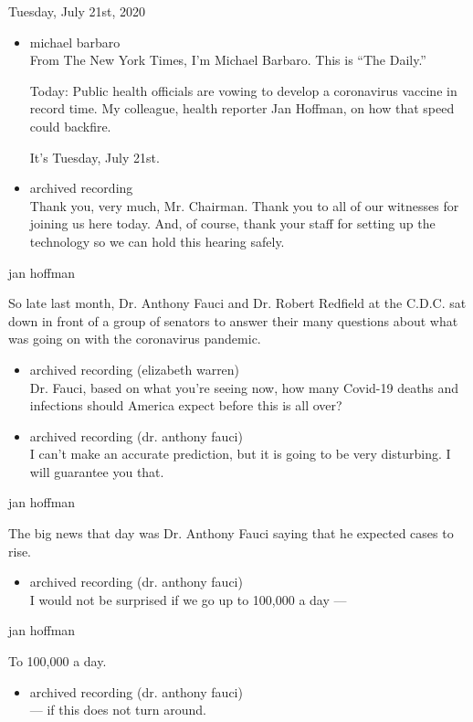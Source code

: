 Tuesday, July 21st, 2020

\begin{itemize}
\item
  michael barbaro\\
  From The New York Times, I'm Michael Barbaro. This is ``The Daily.''

  Today: Public health officials are vowing to develop a coronavirus
  vaccine in record time. My colleague, health reporter Jan Hoffman, on
  how that speed could backfire.

  It's Tuesday, July 21st.
\item
  archived recording\\
  Thank you, very much, Mr. Chairman. Thank you to all of our witnesses
  for joining us here today. And, of course, thank your staff for
  setting up the technology so we can hold this hearing safely.
\end{itemize}

jan hoffman

So late last month, Dr. Anthony Fauci and Dr. Robert Redfield at the
C.D.C. sat down in front of a group of senators to answer their many
questions about what was going on with the coronavirus pandemic.

\begin{itemize}
\item
  archived recording (elizabeth warren)\\
  Dr. Fauci, based on what you're seeing now, how many Covid-19 deaths
  and infections should America expect before this is all over?
\item
  archived recording (dr. anthony fauci)\\
  I can't make an accurate prediction, but it is going to be very
  disturbing. I will guarantee you that.
\end{itemize}

jan hoffman

The big news that day was Dr. Anthony Fauci saying that he expected
cases to rise.

\begin{itemize}
\tightlist
\item
  archived recording (dr. anthony fauci)\\
  I would not be surprised if we go up to 100,000 a day ---
\end{itemize}

jan hoffman

To 100,000 a day.

\begin{itemize}
\tightlist
\item
  archived recording (dr. anthony fauci)\\
  --- if this does not turn around.
\end{itemize}

